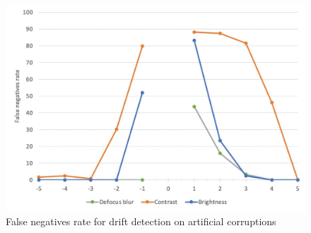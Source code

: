 \begin{figure}[H]
	\begin{center}
		\includegraphics[width=0.8\linewidth]{bilder/drift-detection/fn-rate.jpg}
		\caption{False negatives rate for drift detection on artificial corruptions}\label{fig:fn-rate}
	\end{center}
\end{figure}
